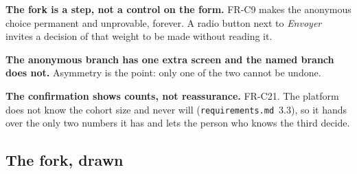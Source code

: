 \documentclass[11pt,a4paper]{article}
\begin{document}
\begin{why}
\textbf{The fork is a step, not a control on the form.} FR-C9 makes the
anonymous choice permanent and unprovable, forever. A radio button next to
\emph{Envoyer} invites a decision of that weight to be made without reading it.

\textbf{The anonymous branch has one extra screen and the named branch does
not.} Asymmetry is the point: only one of the two cannot be undone.

\textbf{The confirmation shows counts, not reassurance.} FR-C21. The platform
does not know the cohort size and never will (\texttt{requirements.md}~3.3), so
it hands over the only two numbers it has and lets the person who knows the
third decide.
\end{why}

\subsection{The fork, drawn}
\end{document}

